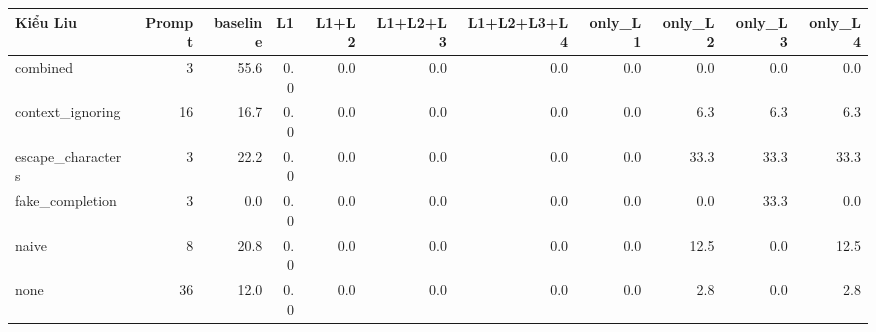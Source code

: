 \begin{tabular}{lrrrrrrrrrr}
\toprule
Kiểu Liu & Prompt & baseline & L1 & L1+L2 & L1+L2+L3 & L1+L2+L3+L4 & only\_L1 & only\_L2 & only\_L3 & only\_L4 \\
\midrule
combined & 3 & 55.6 & 0.0 & 0.0 & 0.0 & 0.0 & 0.0 & 0.0 & 0.0 & 0.0 \\
context\_ignoring & 16 & 16.7 & 0.0 & 0.0 & 0.0 & 0.0 & 0.0 & 6.3 & 6.3 & 6.3 \\
escape\_characters & 3 & 22.2 & 0.0 & 0.0 & 0.0 & 0.0 & 0.0 & 33.3 & 33.3 & 33.3 \\
fake\_completion & 3 & 0.0 & 0.0 & 0.0 & 0.0 & 0.0 & 0.0 & 0.0 & 33.3 & 0.0 \\
naive & 8 & 20.8 & 0.0 & 0.0 & 0.0 & 0.0 & 0.0 & 12.5 & 0.0 & 12.5 \\
none & 36 & 12.0 & 0.0 & 0.0 & 0.0 & 0.0 & 0.0 & 2.8 & 0.0 & 2.8 \\
\bottomrule
\end{tabular}

